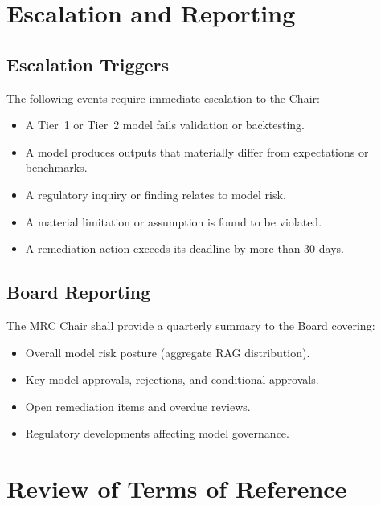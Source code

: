 \documentclass[11pt]{article}
\begin{document}
\section{Escalation and Reporting}

\subsection{Escalation Triggers}

The following events require immediate escalation to the Chair:

\begin{itemize}
    \item A Tier~1 or Tier~2 model fails validation or backtesting.
    \item A model produces outputs that materially differ from expectations
          or benchmarks.
    \item A regulatory inquiry or finding relates to model risk.
    \item A material limitation or assumption is found to be violated.
    \item A remediation action exceeds its deadline by more than 30 days.
\end{itemize}

\subsection{Board Reporting}

The MRC Chair shall provide a quarterly summary to the Board covering:

\begin{itemize}
    \item Overall model risk posture (aggregate RAG distribution).
    \item Key model approvals, rejections, and conditional approvals.
    \item Open remediation items and overdue reviews.
    \item Regulatory developments affecting model governance.
\end{itemize}

\section{Review of Terms of Reference}
\end{document}
